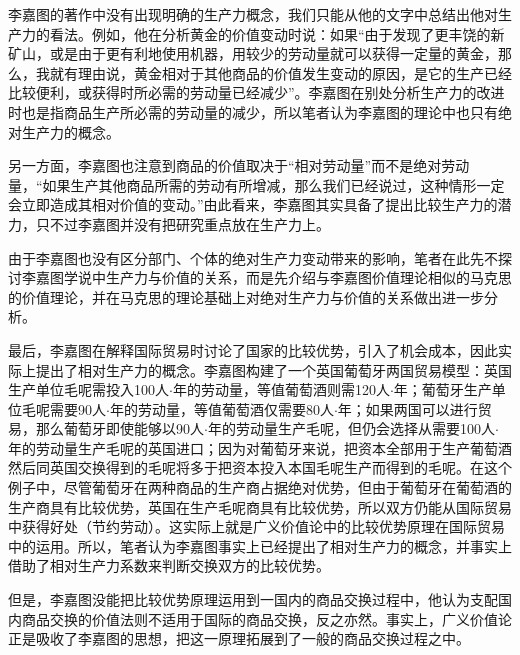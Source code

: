 李嘉图的著作中没有出现明确的生产力概念，我们只能从他的文字中总结出他对生产力的看法。例如，他在分析黄金的价值变动时说：如果“由于发现了更丰饶的新矿山，或是由于更有利地使用机器，用较少的劳动量就可以获得一定量的黄金，那么，我就有理由说，黄金相对于其他商品的价值发生变动的原因，是它的生产已经比较便利，或获得时所必需的劳动量已经减少”\cite[11]{DaWei*LiJiaTuZhengZhiJingJiXueJiFuShuiYuanLi2021}。李嘉图在别处分析生产力的改进时也是指商品生产所必需的劳动量的减少，所以笔者认为李嘉图的理论中也只有绝对生产力的概念。

另一方面，李嘉图也注意到商品的价值取决于“相对劳动量”而不是绝对劳动量\cite[5]{DaWei*LiJiaTuZhengZhiJingJiXueJiFuShuiYuanLi2021}，“如果生产其他商品所需的劳动有所增减，那么我们已经说过，这种情形一定会立即造成其相对价值的变动。”\cite[21]{DaWei*LiJiaTuZhengZhiJingJiXueJiFuShuiYuanLi2021}由此看来，李嘉图其实具备了提出比较生产力的潜力，只不过李嘉图并没有把研究重点放在生产力上。

由于李嘉图也没有区分部门、个体的绝对生产力变动带来的影响，笔者在此先不探讨李嘉图学说中生产力与价值的关系，而是先介绍与李嘉图价值理论相似的马克思的价值理论，并在马克思的理论基础上对绝对生产力与价值的关系做出进一步分析。

最后，李嘉图在解释国际贸易时讨论了国家的比较优势，引入了机会成本，因此实际上提出了相对生产力的概念。李嘉图构建了一个英国葡萄牙两国贸易模型：英国生产单位毛呢需投入100人$\cdot$年的​劳动量，等值葡萄酒则需120人$\cdot$年；葡萄牙生产单位毛呢需要90人$\cdot$年的劳动量，等值葡萄酒仅需要80人$\cdot$年；如果两国可以进行贸易，那么葡萄牙即使能够以90人$\cdot$年的劳动量生产毛呢，但仍会选择从需要100人$\cdot$年的​劳动量生产毛呢的英国进口；因为对葡萄牙来说，把资本全部用于生产葡萄酒然后同英国交换得到的毛呢将多于把资本投入本国毛呢生产而得到的毛呢\cite[111-112]{DaWei*LiJiaTuZhengZhiJingJiXueJiFuShuiYuanLi2021}。在这个例子中，尽管葡萄牙在两种商品的生产商占据绝对优势，但由于葡萄牙在葡萄酒的生产商具有比较优势，英国在生产毛呢商具有比较优势，所以双方仍能从国际贸易中获得好处（节约劳动）。这实际上就是广义价值论中的比较优势原理在国际贸易中的运用。所以，笔者认为李嘉图事实上已经提出了相对生产力的概念，并事实上借助了相对生产力系数来判断交换双方的比较优势。

但是，李嘉图没能把比较优势原理运用到一国内的商品交换过程中，他认为支配国内商品交换的价值法则不适用于国际的商品交换，反之亦然\cite[110]{DaWei*LiJiaTuZhengZhiJingJiXueJiFuShuiYuanLi2021}。事实上，广义价值论正是吸收了李嘉图的思想，把这一原理拓展到了一般的商品交换过程之中\cite[157]{CaiJiMingCongGuDianZhengZhiJingJiXueDaoZhongGuoTeSeSheHuiZhuYiZhengZhiJingJiXueJiYuZhongGuoShiJiaoDeZhengZhiJingJiXueYanBianShangCe2023}。

